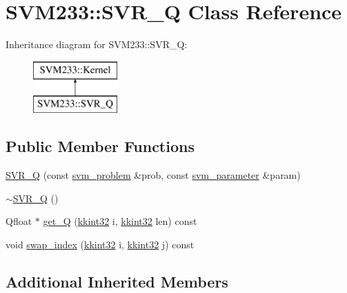 \hypertarget{class_s_v_m233_1_1_s_v_r___q}{}\section{S\+V\+M233\+:\+:S\+V\+R\+\_\+Q Class Reference}
\label{class_s_v_m233_1_1_s_v_r___q}
Inheritance diagram for S\+V\+M233\+:\+:S\+V\+R\+\_\+Q\+:\begin{figure}[H]
\begin{center}
\leavevmode
\includegraphics[height=2.000000cm]{class_s_v_m233_1_1_s_v_r___q}
\end{center}
\end{figure}
\subsection*{Public Member Functions}
\begin{DoxyCompactItemize}
\item 
\hyperlink{class_s_v_m233_1_1_s_v_r___q_a98a5e4943cd6ccaddbdd23a7b7626698}{S\+V\+R\+\_\+Q} (const \hyperlink{struct_s_v_m233_1_1svm__problem}{svm\+\_\+problem} \&prob, const \hyperlink{struct_s_v_m233_1_1svm__parameter}{svm\+\_\+parameter} \&param)
\item 
\hyperlink{class_s_v_m233_1_1_s_v_r___q_aa6aacb03f7850cb8194aae758106df19}{$\sim$\+S\+V\+R\+\_\+Q} ()
\item 
Qfloat $\ast$ \hyperlink{class_s_v_m233_1_1_s_v_r___q_a2b793e428e5518a550725c27394b54f7}{get\+\_\+Q} (\hyperlink{namespace_k_k_b_a8fa4952cc84fda1de4bec1fbdd8d5b1b}{kkint32} i, \hyperlink{namespace_k_k_b_a8fa4952cc84fda1de4bec1fbdd8d5b1b}{kkint32} len) const 
\item 
void \hyperlink{class_s_v_m233_1_1_s_v_r___q_ad03e7fa3123ab8590850ced7315c6c62}{swap\+\_\+index} (\hyperlink{namespace_k_k_b_a8fa4952cc84fda1de4bec1fbdd8d5b1b}{kkint32} i, \hyperlink{namespace_k_k_b_a8fa4952cc84fda1de4bec1fbdd8d5b1b}{kkint32} j) const 
\end{DoxyCompactItemize}
\subsection*{Additional Inherited Members}


